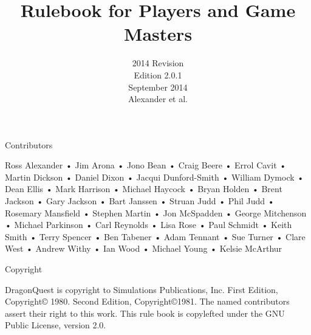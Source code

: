 \documentclass[a4paper]{report}
\title{Rulebook for Players and Game Masters}
\author{2014 Revision\\Edition 2.0.1\\September 2014\\Alexander et al.}
\date{\thisday}
\begin{document}
Contributors

Ross Alexander • Jim Arona • Jono Bean • Craig Beere • Errol Cavit • Martin Dickson • Daniel Dixon • Jacqui Dunford-Smith • William Dymock • Dean Ellis • Mark Harrison • Michael Haycock • Bryan Holden • Brent Jackson • Gary Jackson • Bart Janssen • Struan Judd • Phil Judd • Rosemary Mansfield • Stephen Martin • Jon McSpadden • George Mitchenson • Michael Parkinson • Carl Reynolds • Lisa Rose • Paul Schmidt • Keith Smith • Terry Spencer • Ben Tabener • Adam Tennant • Sue Turner • Clare West • Andrew Withy • Ian Wood • Michael Young • Kelsie McArthur

Copyright

DragonQuest is copyright to Simulations Publications, Inc. First
Edition, Copyright© 1980. Second Edition, Copyright©1981.  The named
contributors assert their right to this work. This rule book is
copylefted under the GNU Public License, version 2.0.


\end{document}
